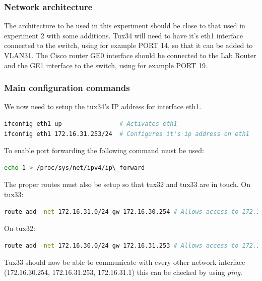 \documentclass[a4paper,11pt,english]{article}
\begin{document}
        \subsubsection{Network architecture}
            The architecture to be used in this experiment should be close to that used
            in experiment 2 with some additions.
            Tux34 will need to have it's eth1 interface connected to the switch, using
            for example PORT 14, so that it can be added to VLAN31.
            The Cisco router GE0 interface should be connected to the Lab Router and 
            the GE1 interface to the switch, using for example PORT 19. 

        \subsubsection{Main configuration commands}
            We now need to setup the tux34's IP address for interface eth1.

\begin{lstlisting}[language=sh]
ifconfig eth1 up                # Activates eth1
ifconfig eth1 172.16.31.253/24  # Configures it's ip address on eth1
\end{lstlisting}
            
            \noindent To enable port forwarding the following command must be used:
\begin{lstlisting}[language=sh]
echo 1 > /proc/sys/net/ipv4/ip\_forward
\end{lstlisting}

            \noindent The proper routes must also be setup so that tux32 and tux33 are in touch.
            On tux33:

\begin{lstlisting}[language=sh]
route add -net 172.16.31.0/24 gw 172.16.30.254 # Allows access to 172.16.31.X through tux34 (172.16.30.254)
\end{lstlisting}

            On tux32:

\begin{lstlisting}[language=sh]
route add -net 172.16.30.0/24 gw 172.16.31.253 # Allows access to 172.16.30.X through tux34 (172.16.31.253)
\end{lstlisting}

            Tux33 should now be able to communicate with every other network interface 
            (172.16.30.254, 172.16.31.253, 172.16.31.1) this can be checked by using 
            \textit{ping}.
\end{document}
